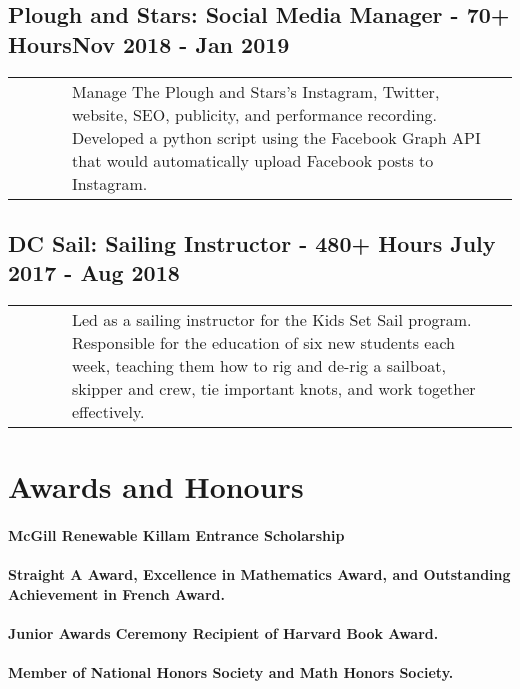 \documentclass{article}
\begin{document}
\subsection{Plough and Stars: Social Media Manager - 70+ Hours\hfill Nov 2018 - Jan 2019\newline}

\begin{tabularx}{\linewidth}{ @{} l X r @{} }
\ \ \ \ \ & Manage The Plough and Stars’s Instagram, Twitter, website, SEO, publicity, and performance recording. Developed a python script using the Facebook Graph API that would automatically upload Facebook posts to Instagram.
\end{tabularx}

\subsection{DC Sail: Sailing Instructor - 480+ Hours \hfill July 2017 - Aug 2018\newline}

\begin{tabularx}{\linewidth}{ @{} l X r @{} }
\ \ \ \ \ & Led as a sailing instructor for the Kids Set Sail program. Responsible for the education of six new students each week,  teaching them how to rig and de-rig a sailboat,  skipper and crew,  tie important knots, and work together effectively.
\end{tabularx}

\section{Awards and Honours}

\paragraph{McGill Renewable Killam Entrance Scholarship}

\paragraph{Straight A Award, Excellence in Mathematics Award, and Outstanding Achievement in French Award.}

\paragraph{Junior Awards Ceremony Recipient of Harvard Book Award.}

\paragraph{Member of National Honors Society and Math Honors Society.}
\end{document}
